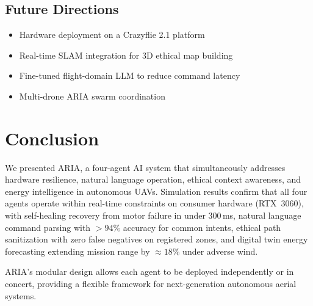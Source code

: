 \documentclass[10pt,twocolumn]{article}
\begin{document}
\subsection{Future Directions}
\begin{itemize}
    \item Hardware deployment on a Crazyflie 2.1 platform
    \item Real-time SLAM integration for 3D ethical map building
    \item Fine-tuned flight-domain LLM to reduce command latency
    \item Multi-drone ARIA swarm coordination
\end{itemize}

\section{Conclusion}
\label{sec:conclusion}
We presented ARIA, a four-agent AI system that simultaneously
addresses hardware resilience, natural language operation, ethical
context awareness, and energy intelligence in autonomous UAVs.
Simulation results confirm that all four agents operate within
real-time constraints on consumer hardware (RTX~3060), with
self-healing recovery from motor failure in under 300\,ms, natural
language command parsing with $>94\%$ accuracy for common intents,
ethical path sanitization with zero false negatives on registered
zones, and digital twin energy forecasting extending mission range
by ${\approx}18\%$ under adverse wind.

ARIA's modular design allows each agent to be deployed
independently or in concert, providing a flexible framework for
next-generation autonomous aerial systems.
\end{document}
